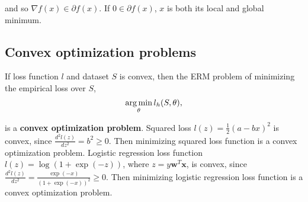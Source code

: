\documentclass[../main.tex]{subfiles}
\begin{document}
and so $\nabla f(x)\in \partial f(x)$. If $0\in \partial f(x)$, $x$ is both its local and global minimum.

\subsection{Convex optimization problems}
If loss function $l$ and dataset $S$ is convex, then the ERM problem of minimizing the empirical loss over $S$, $$\operatorname*{arg\,min}_{\theta}l_h(S, \theta),$$

is a \textbf{convex optimization problem}. Squared loss $l(z)=\frac{1}{2}(a-bx)^2$ is convex, since $\frac{d^2l(z)}{dz^2}=b^2\geq 0$. Then minimizing squared loss function is a convex optimization problem. Logistic regression loss function $l(z)=\log (1+\exp{(-z)})$, where $z=y\textbf{w}^T\textbf{x}$, is convex, since $\frac{d^2l(z)}{dz^2}=\frac{\exp{(-x)}}{(1+\exp{(-x)})^2}\geq 0$. Then minimizing logistic regression loss function is a convex optimization problem.
\end{document}
